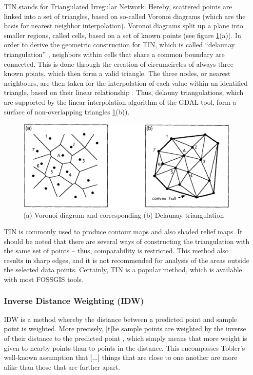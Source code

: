 TIN stands for \ldq{}Triangulated Irregular Network\rdq{}. Hereby, scattered points are linked into a set of triangles, based on so-called Voronoi diagrams (which are the basis for nearest neighbor interpolation). Voronoi diagrams split up a plane into smaller regions, called cells, based on a set of known points (see figure \ref{fig:voronoi_delauny}(a)). In order to derive the geometric construction for TIN, which is called “delaunay triangulation” \cite{sambridge_geophysical_1995}, neighbors within cells that share a common boundary are connected. This is done through the creation of circumcircles of always three known points, which then form a valid triangle. The three nodes, or nearest neighbours, are then taken for the interpolation of each value within an identified triangle, based on their linear relationship \cite{lam_spatial_2009}. Thus, delauny triangulations, which are supported by the linear interpolation algorithm of the GDAL tool, form a surface of non-overlapping triangles \ref{fig:voronoi_delauny}(b)). 


\begin{figure}
	\includegraphics[width=\linewidth]{images/voronoi_delauny.png}
	\caption{(a) Voronoi diagram and corresponding (b) Delaunay triangulation\cite{sambridge_geophysical_1995}}
	\label{fig:voronoi_delauny}
\end{figure}

TIN is commonly used to produce contour maps and also shaded relief maps. \cite{lam_spatial_2009}
It should be noted that there are several ways of constructing the triangulation with the same set of points – thus, comparability is restricted. This method also results in sharp edges, and it is not recommended for analysis of the areas outside the selected data points. \cite{qgis_11_2021} Certainly, TIN is a popular method, which is available with most FOSSGIS tools. 

\subsubsection{Inverse Distance Weighting (IDW)}
IDW is a method whereby the distance between a predicted point and sample point is weighted. More precisely, \ldq{}[t]he sample points are weighted by the inverse of their distance to the predicted point\rdq{} \cite[p.2]{wenjing_cao_study_2009}, which simply means that more weight is given to nearby points than to points in the distance. \cite{lam_spatial_2009} This encompasses Tobler’s well-known assumption that \ldq{}[...] things that are close to one another are more alike than those that are farther apart\rdq{}. \cite{samanta_interpolation_2012}


